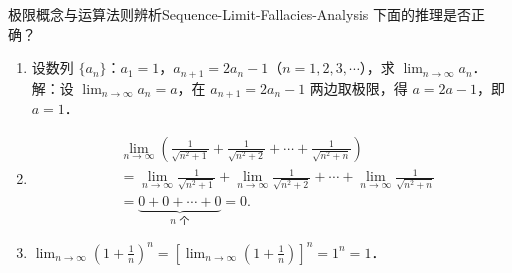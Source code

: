 \begin{problem}{极限概念与运算法则辨析}{Sequence-Limit-Fallacies-Analysis}
    下面的推理是否正确？
    \begin{enumerate}
        \item 设数列 $\{a_n\}$：$a_1 = 1$，$a_{n+1} = 2a_n - 1$（$n = 1, 2, 3, \cdots$），求 $\lim_{n\to\infty} a_n$．
              解：设 $\lim_{n\to\infty} a_n = a$，在 $a_{n+1} = 2a_n - 1$ 两边取极限，得 $a = 2a - 1$，即 $a = 1$．
        \item
              \begin{equation}
                  \begin{aligned}
                       & \lim_{n\to\infty} \left( \frac{1}{\sqrt{n^2 + 1}} + \frac{1}{\sqrt{n^2 + 2}} + \cdots + \frac{1}{\sqrt{n^2 + n}} \right)                        \\
                       & = \lim_{n\to\infty} \frac{1}{\sqrt{n^2 + 1}} + \lim_{n\to\infty} \frac{1}{\sqrt{n^2 + 2}} + \cdots + \lim_{n\to\infty} \frac{1}{\sqrt{n^2 + n}} \\
                       & = \underbrace{0 + 0 + \cdots + 0}_{n\text{ 个}} = 0.
                  \end{aligned}
              \end{equation}
        \item $\lim_{n\to\infty} \left( 1 + \frac{1}{n} \right)^n = \left[ \lim_{n\to\infty} \left( 1 + \frac{1}{n} \right) \right]^n = 1^n = 1$．
    \end{enumerate}
\end{problem}


